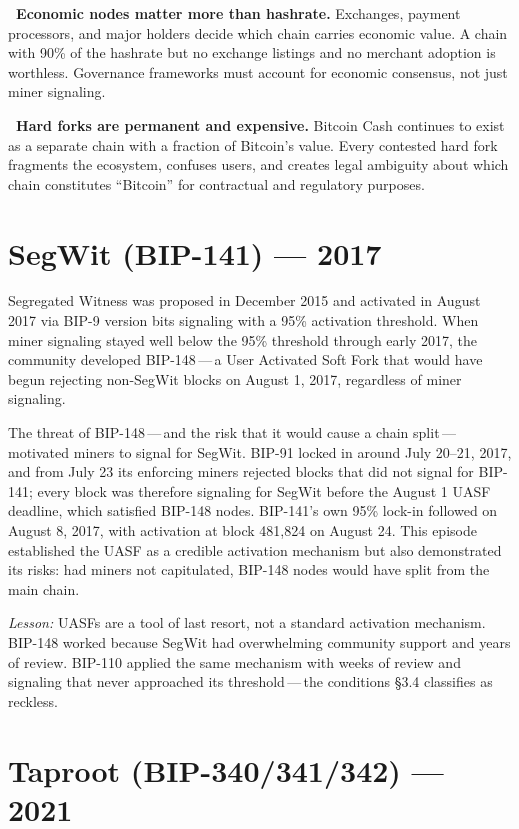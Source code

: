 \documentclass[11pt, twoside, openright]{book}
\newcommand{\reqitem}[2]{\medskip\noindent\textbf{#1\ #2}\quad\ignorespaces}
\newcommand{\sect}[1]{\S#1}
\begin{document}
\reqitem{}{Economic nodes matter more than hashrate.} Exchanges, payment processors, and major holders decide which chain carries economic value. A chain with 90\% of the hashrate but no exchange listings and no merchant adoption is worthless. Governance frameworks must account for economic consensus, not just miner signaling.

\reqitem{}{Hard forks are permanent and expensive.} Bitcoin Cash continues to exist as a separate chain with a fraction of Bitcoin's value. Every contested hard fork fragments the ecosystem, confuses users, and creates legal ambiguity about which chain constitutes ``Bitcoin'' for contractual and regulatory purposes.

\section{SegWit (BIP-141) --- 2017}

Segregated Witness was proposed in December 2015 and activated in August 2017 via BIP-9 version bits signaling with a 95\% activation threshold. When miner signaling stayed well below the 95\% threshold through early 2017, the community developed BIP-148\,---\,a User Activated Soft Fork that would have begun rejecting non-SegWit blocks on August 1, 2017, regardless of miner signaling.

The threat of BIP-148\,---\,and the risk that it would cause a chain split\,---\,motivated miners to signal for SegWit. BIP-91 locked in around July 20--21, 2017, and from July 23 its enforcing miners rejected blocks that did not signal for BIP-141; every block was therefore signaling for SegWit before the August 1 UASF deadline, which satisfied BIP-148 nodes. BIP-141's own 95\% lock-in followed on August 8, 2017, with activation at block 481{,}824 on August 24. This episode established the UASF as a credible activation mechanism but also demonstrated its risks: had miners not capitulated, BIP-148 nodes would have split from the main chain.

\textit{Lesson:} UASFs are a tool of last resort, not a standard activation mechanism. BIP-148 worked because SegWit had overwhelming community support and years of review. BIP-110 applied the same mechanism with weeks of review and signaling that never approached its threshold\,---\,the conditions \sect{3.4} classifies as reckless.

\section{Taproot (BIP-340/341/342) --- 2021}
\end{document}
